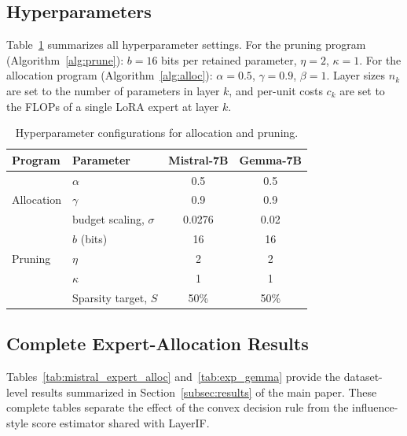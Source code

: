 \documentclass[accepted]{uai2026}%
\theoremstyle{remark}%
\begin{document}
\subsection{Hyperparameters}
\label{appendix:hyperparameter}
Table~\ref{tab:hyperparams} summarizes all hyperparameter settings.
For the pruning program (Algorithm~\ref{alg:prune}):
$b = 16$ bits per retained parameter, $\eta = 2$, $\kappa = 1$.
For the allocation program (Algorithm~\ref{alg:alloc}):
$\alpha = 0.5$, $\gamma = 0.9$, $\beta = 1$.
Layer sizes $n_k$ are set to the number of parameters in layer $k$,
and per-unit costs $c_k$ are set to the FLOPs of a single LoRA
expert at layer $k$.

\begin{table}[h]
\centering
\caption{Hyperparameter configurations for allocation and pruning.}
\label{tab:hyperparams}
\begin{tabular}{llcc}
\toprule
\textbf{Program} & \textbf{Parameter} & \textbf{Mistral-7B} & \textbf{Gemma-7B} \\
\midrule
\multirow{3}{*}{Allocation}
  & $\alpha$   & 0.5    & 0.5  \\
  & $\gamma$   & 0.9    & 0.9  \\
  & budget scaling, $\sigma$ & 0.0276 & 0.02 \\
\midrule
\multirow{3}{*}{Pruning}
  & $b$ (bits) & 16     & 16   \\
  & $\eta$     & 2      & 2    \\
  & $\kappa$   & 1      & 1    \\
  & Sparsity target, $S$ & 50\% & 50\% \\
\bottomrule
\end{tabular}
\end{table}

\subsection{Complete Expert-Allocation Results}
Tables~\ref{tab:mistral_expert_alloc} and~\ref{tab:exp_gemma} provide the
dataset-level results summarized in Section~\ref{subsec:results} of the main
paper. These complete tables separate the effect of the convex decision rule
from the influence-style score estimator shared with LayerIF.
\end{document}
